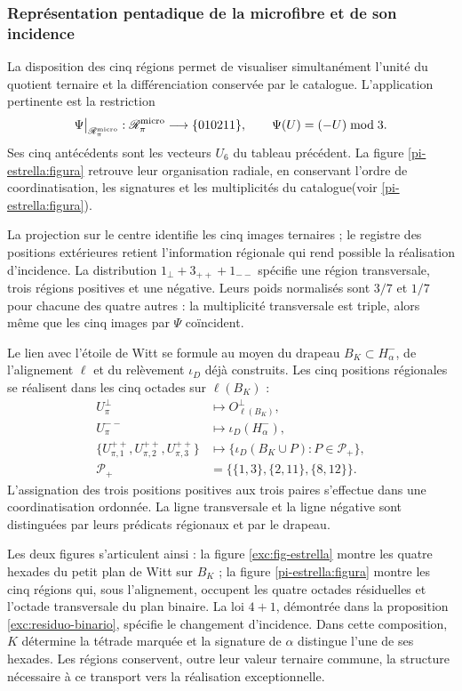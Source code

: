 \subsubsection{Représentation pentadique de la microfibre et de son incidence}
\label{pi-estrella:desarrollo}

La disposition des cinq régions permet de visualiser simultanément
l'unité du quotient ternaire et la différenciation conservée par le
catalogue. L'application pertinente est la restriction
\[
 \Psi\big|_{\mathscr R_\pi^{\rm micro}}:
 \mathscr R_\pi^{\rm micro}\longrightarrow\{010211\},
 \qquad \Psi(U)=(-U)\bmod3.
\]
Ses cinq antécédents sont les vecteurs \(U_6\) du tableau précédent.
La figure \ref{pi-estrella:figura} retrouve leur organisation radiale,
en conservant l’ordre de coordinatisation, les signatures et les multiplicités du
catalogue(voir \ref{pi-estrella:figura}).



La projection sur le centre identifie les cinq images ternaires ; le
registre des positions extérieures retient l'information régionale
qui rend possible la réalisation d'incidence. La distribution
\(1_\perp+3_{++}+1_{--}\) spécifie une région transversale, trois
régions positives et une négative. Leurs poids normalisés sont
\(3/7\) et \(1/7\) pour chacune des quatre autres : la
multiplicité transversale est triple, alors même que les cinq images par
\(\Psi\) coïncident.

Le lien avec l'étoile de Witt se formule au moyen du drapeau
\(B_K\subset H^-_\alpha\), de l'alignement \(\ell\) et du
relèvement \(\iota_D\) déjà construits. Les cinq positions régionales
se réalisent dans les cinq octades sur \(\ell(B_K)\) :
\[
\begin{aligned}
 U_\pi^\perp&\longmapsto O^\perp_{\ell(B_K)},\\
 U_\pi^{--}&\longmapsto\iota_D(H^-_\alpha),\\
 \{U_{\pi,1}^{++},U_{\pi,2}^{++},U_{\pi,3}^{++}\}
 &\longmapsto
 \{\iota_D(B_K\cup P):P\in\mathcal P_+\},\\
 \mathcal P_+&=\bigl\{\{1,3\},\{2,11\},\{8,12\}\bigr\}.
\end{aligned}
\]
L'assignation des trois positions positives aux trois paires
s'effectue dans une coordinatisation ordonnée. La ligne transversale et la ligne négative
sont distinguées par leurs prédicats régionaux et par le drapeau.

Les deux figures s'articulent ainsi : la figure
\ref{exc:fig-estrella} montre les quatre hexades du petit plan
de Witt sur \(B_K\) ; la figure \ref{pi-estrella:figura} montre
les cinq régions qui, sous l'alignement, occupent les quatre octades
résiduelles et l'octade transversale du plan binaire. La loi
\(4+1\), démontrée dans la proposition
\ref{exc:residuo-binario}, spécifie le changement d'incidence. Dans cette
composition, \(K\) détermine la tétrade marquée et la signature de
\(\alpha\) distingue l'une de ses hexades. Les régions conservent,
outre leur valeur ternaire commune, la structure nécessaire à ce
transport vers la réalisation exceptionnelle.
